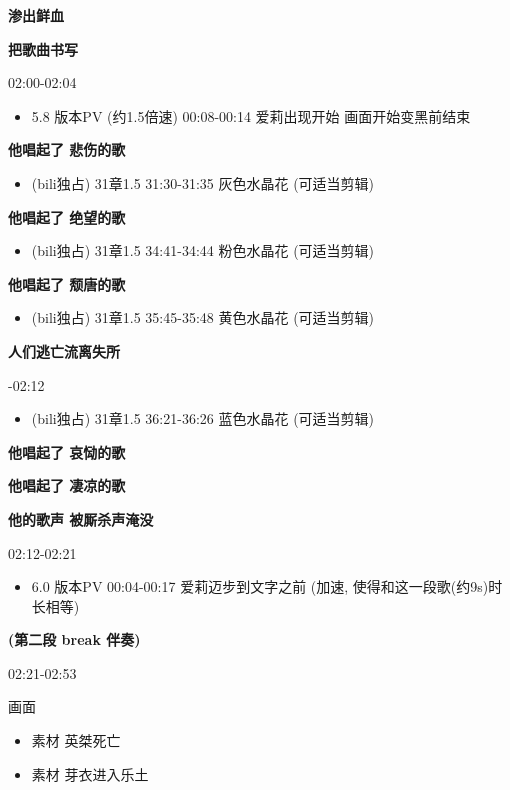 \documentclass[a4paper]{article}
\begin{document}
\textbf{渗出鲜血}

\textbf{把歌曲书写}

02:00-02:04

\begin{itemize}
    \item 5.8 版本PV (约1.5倍速) 00:08-00:14 爱莉出现开始 画面开始变黑前结束
\end{itemize}

\textbf{他唱起了 悲伤的歌}

\begin{itemize}
    \item (bili独占) 31章1.5 31:30-31:35 灰色水晶花 (可适当剪辑)
\end{itemize}

\textbf{他唱起了 绝望的歌}

\begin{itemize}
    \item (bili独占) 31章1.5 34:41-34:44 粉色水晶花 (可适当剪辑)
\end{itemize}

\textbf{他唱起了 颓唐的歌}

\begin{itemize}
    \item (bili独占) 31章1.5 35:45-35:48 黄色水晶花 (可适当剪辑)
\end{itemize}

\textbf{人们逃亡流离失所}

-02:12

\begin{itemize}
    \item (bili独占) 31章1.5 36:21-36:26 蓝色水晶花 (可适当剪辑)
\end{itemize}

\textbf{他唱起了 哀恸的歌}

\textbf{他唱起了 凄凉的歌}

\textbf{他的歌声 被厮杀声淹没}

02:12-02:21

\begin{itemize}
    \item 6.0 版本PV 00:04-00:17 爱莉迈步到文字之前 (加速, 使得和这一段歌(约9s)时长相等)
\end{itemize}

\textbf{(第二段 break 伴奏)}

02:21-02:53

画面

\begin{itemize}
    \item 素材 英桀死亡
    \item 素材 芽衣进入乐土
\end{itemize}
\end{document}
